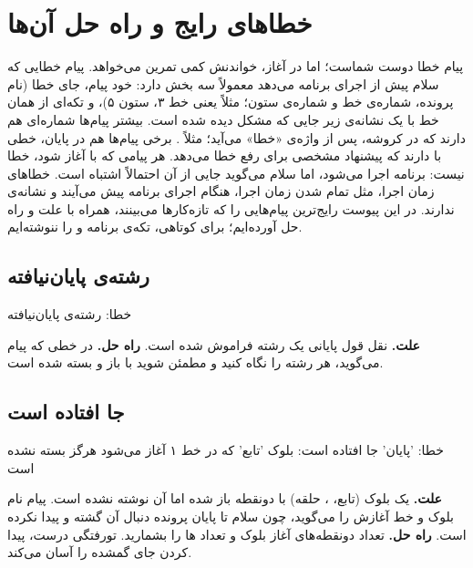 \chapter{خطاهای رایج و راه حل آن‌ها}\label{app:errors}

پیام خطا دوست شماست؛ اما در آغاز، خواندنش کمی تمرین می‌خواهد. پیام خطایی که
سلام پیش از اجرای برنامه می‌دهد معمولاً سه بخش دارد: خود پیام، جای خطا (نام پرونده، شماره‌ی خط و شماره‌ی ستون؛
مثلاً  یعنی خط ۳، ستون ۵)، و
تکه‌ای از همان خط با یک نشانه‌ی \code{\textasciicircum} زیر جایی که مشکل
دیده شده است. بیشتر پیام‌ها شماره‌ای هم دارند که در کروشه، پس از واژه‌ی
«خطا» می‌آید؛ مثلاً . برخی پیام‌ها هم در پایان، خطی با
 دارند که پیشنهاد مشخصی برای رفع خطا می‌دهد. هر پیامی که با
 آغاز شود، خطا نیست: برنامه اجرا می‌شود، اما سلام می‌گوید جایی از
آن احتمالاً اشتباه است. خطاهای زمان اجرا، مثل تمام شدن زمان اجرا، هنگام
اجرای برنامه پیش می‌آیند و نشانه‌ی \code{\textasciicircum} ندارند.
در این پیوست رایج‌ترین پیام‌هایی را که تازه‌کارها
می‌بینند، همراه با علت و راه حل آورده‌ایم؛ برای کوتاهی، تکه‌ی برنامه و
\code{\textasciicircum} را ننوشته‌ایم.

\section*{رشته‌ی پایان‌نیافته}

\begin{progoutfa}
خطا: رشته‌ی پایان‌نیافته
\end{progoutfa}

\textbf{علت.} نقل قول پایانی یک رشته فراموش شده است.
\textbf{راه حل.} در خطی که پیام می‌گوید، هر رشته را نگاه کنید و مطمئن شوید
با  باز و بسته شده است.

\section*{ جا افتاده است}

\begin{progoutfa}
خطا: 'پایان' جا افتاده است: بلوک 'تابع' که در خط ۱ آغاز می‌شود هرگز بسته نشده است
\end{progoutfa}

\textbf{علت.} یک بلوک (تابع، ، حلقه) با دونقطه باز شده اما
 آن نوشته نشده است. پیام نام بلوک و خط آغازش را می‌گوید، چون
سلام تا پایان پرونده دنبال  آن گشته و پیدا نکرده است.
\textbf{راه حل.} تعداد دونقطه‌های آغاز بلوک و تعداد ‌ها را
بشمارید. تورفتگی درست، پیدا کردن جای گمشده را آسان می‌کند.


